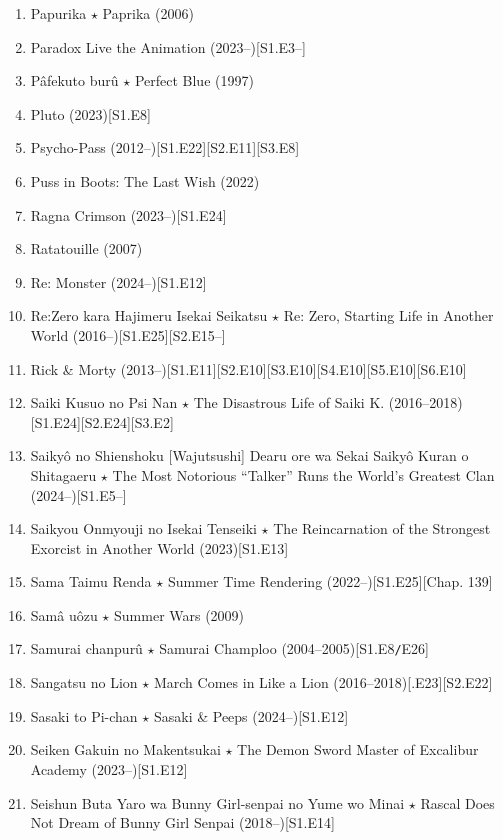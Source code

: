 \documentclass{article}
\begin{document}
\begin{enumerate}
    \item {\sc Papurika $\star$ Paprika} (2006)
    \item Paradox Live the Animation (2023--)\hfill[S1.E3--]
    \item {\sc Pâfekuto burû $\star$ Perfect Blue} (1997)
    \item {\sc Pluto} (2023)\hfill[S1.E8]
    \item {\sc Psycho-Pass} (2012--)\hfill[S1.E22][S2.E11][S3.E8]
    \item {\sc Puss in Boots: The Last Wish} (2022)
    \item {\sc Ragna Crimson} (2023--)\hfill[S1.E24]
    \item {\sc Ratatouille} (2007)
    \item {\sc Re: Monster} (2024--)\hfill[S1.E12]
    \item Re:Zero kara Hajimeru Isekai Seikatsu $\star$ Re: Zero, Starting Life in Another World (2016--)\hfill[S1.E25][S2.E15--]
    \item Rick \& Morty (2013--)\hfill[S1.E11][S2.E10][S3.E10][S4.E10][S5.E10][S6.E10]
    \item {\sc Saiki Kusuo no Psi Nan $\star$ The Disastrous Life of Saiki K.} (2016--2018)\hfill[S1.E24][S2.E24][S3.E2]
    \item Saikyô no Shienshoku [Wajutsushi] Dearu ore wa Sekai Saikyô Kuran o Shitagaeru $\star$ The Most Notorious ``Talker'' Runs the World's Greatest Clan (2024--)\hfill[S1.E5--]
    \item {\sc Saikyou Onmyouji no Isekai Tenseiki $\star$ The Reincarnation of the Strongest Exorcist in Another World} (2023)\hfill[S1.E13]
    \item {\sc Sama Taimu Renda $\star$ Summer Time Rendering} (2022--)\hfill[S1.E25][Chap. 139]
    \item {\sc Samâ uôzu $\star$ Summer Wars} (2009)
    \item Samurai chanpurû $\star$ Samurai Champloo (2004--2005)\hfill[S1.E8{\tt/}E26]
    \item {\sc Sangatsu no Lion $\star$ March Comes in Like a Lion} (2016--2018)\hfill[.E23][S2.E22]
    \item {\sc Sasaki to Pi-chan $\star$ Sasaki \& Peeps} (2024--)\hfill[S1.E12]
    \item {\sc Seiken Gakuin no Makentsukai $\star$ The Demon Sword Master of Excalibur Academy} (2023--)\hfill[S1.E12]
    \item {\sc Seishun Buta Yaro wa Bunny Girl-senpai no Yume wo Minai $\star$ Rascal Does Not Dream of Bunny Girl Senpai} (2018--)\hfill[S1.E14]

\end{enumerate}
\end{document}
